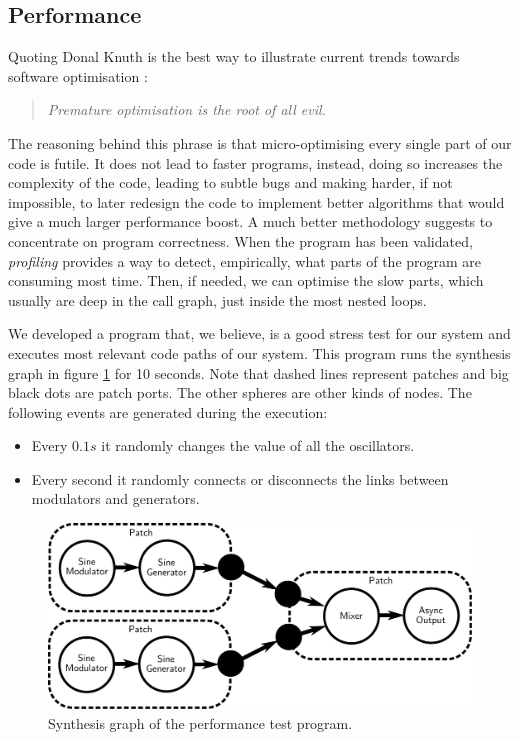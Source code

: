 \subsection{Performance}

Quoting Donal Knuth is the best way to illustrate current trends
towards software optimisation \cite{knuth74structured}:
\begin{quote}
  \it Premature optimisation is the root of all evil.
\end{quote}

The reasoning behind this phrase is that micro-optimising every single
part of our code is futile. It does not lead to faster programs,
instead, doing so increases the complexity of the code, leading to
subtle bugs and making harder, if not impossible, to later redesign
the code to implement better algorithms that would give a much larger
performance boost. A much better methodology suggests to concentrate
on program correctness. When the program has been validated,
\emph{profiling} provides a way to detect,
empirically, what parts of the program are consuming most time. Then,
if needed, we can optimise the slow parts, which usually are deep in
the call graph, just inside the most nested loops.

We developed a program that, we believe, is a good stress test for our
system and executes most relevant code paths of our system. This
program runs the synthesis graph in figure \ref{fig:perfgraph} for 10
seconds. Note that dashed lines represent patches and big black dots
are patch ports. The other spheres are other kinds of nodes. The
following events are generated during the execution:
\begin{itemize}
\item Every $0.1 s$ it randomly changes the value of all the
  oscillators.
\item Every second it randomly connects or disconnects the links
  between modulators and generators.  
\end{itemize}

\begin{figure}[h]
  \centering
  \includegraphics[width=\textwidth]{pic/graph-perf.pdf}
  \caption{Synthesis graph of the performance test program.}
  \label{fig:perfgraph}
\end{figure}

